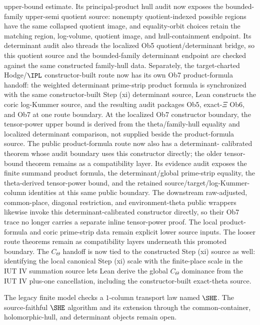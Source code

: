 \begin{proposition}
  upper-bound estimate.  Its principal-product hull audit now exposes the
  bounded-family upper-semi quotient source: nonempty quotient-indexed possible
  regions have the same collapsed quotient image, and equality-orbit choices
  retain the matching region, log-volume, quotient image, and hull-containment
  endpoint.  Its determinant audit also threads the localized Ob5
  quotient/determinant bridge, so this quotient source and the bounded-family
  determinant endpoint are checked against the same constructed family-hull
  data.  Separately, the target-charted Hodge/\(\IPL\) constructor-built
  route now has its own Ob7 product-formula handoff: the weighted
  determinant prime-strip product formula is synchronized with the same
  constructor-built Step (xi) determinant source, Lean constructs the coric
  log-Kummer source, and the resulting audit packages Ob5, exact-\(\Xi\) Ob6,
  and Ob7 at one route boundary.  At the localized Ob7 constructor boundary,
  the tensor-power upper bound is derived from the theta/family-hull equality
  and localized determinant comparison, not supplied beside the product-formula
  source.  The public product-formula route now also has a determinant-
  calibrated theorem whose audit boundary uses this constructor directly; the
  older tensor-bound theorem remains as a compatibility layer.  Its evidence
  audit exposes the finite summand product formula, the determinant/global
  prime-strip equality, the theta-derived tensor-power bound, and the retained
  source/target/log-Kummer-column identities at this same public boundary.  The downstream
  raw-adjusted, common-place, diagonal restriction, and environment-theta
  public wrappers likewise invoke this determinant-calibrated constructor
  directly, so their Ob7 trace no longer carries a separate inline tensor-power
  proof.  The local product-formula and coric prime-strip data remain
  explicit lower source inputs.  The looser route
  theorems remain as compatibility layers underneath this promoted boundary.
  The \(C_\Theta\) handoff is now tied to the constructed Step (xi) source as
  well: identifying the local canonical Step (xi) scale with the finite-place
  scale in the IUT IV summation source lets Lean derive the global
  \(C_\Theta\) dominance from the IUT IV plus-one cancellation, including the
  constructor-built exact-theta source.
\end{proposition}

\begin{theorem}
  \label{thm:construct-she}
  \notready
  The legacy finite model checks a \(1\)-column transport law named
  \(\SHE\). The source-faithful \(\SHE\) algorithm and its extension through
  the common-container, holomorphic-hull, and determinant objects remain open.
\end{theorem}

